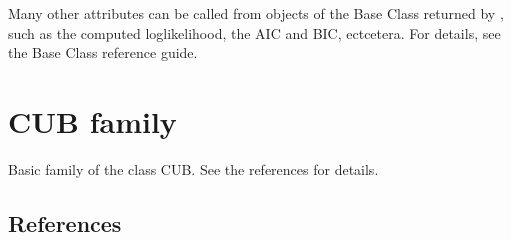 \documentclass[letterpaper,10pt,english]{sphinxmanual}
\begin{document}
\sphinxAtStartPar
Many other attributes can be called from objects of the Base Class  returned by
, such as the computed loglikelihood, the AIC and BIC, ectcetera. For details,
see the Base Class  reference guide.


\section{CUB family}
\label{\detokenize{manual:cub-family}}
\sphinxAtStartPar
Basic family of the class CUB. See the references for details.


\subsection{References}
\end{document}
